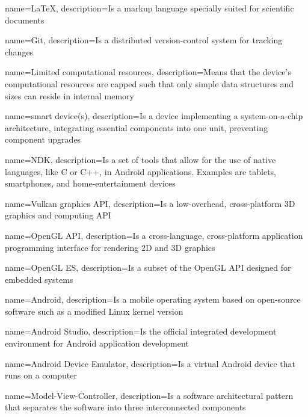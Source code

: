 {
    name={LaTeX},
    description={Is a markup language specially suited 
    for scientific documents \cite{latexref}}
}

{
    name={Git},
    description={Is a distributed version-control system for tracking changes \cite{gitref}}
}

{
    name={Limited computational resources},
    description={Means that the device's computational resources are capped such that only simple data structures and sizes can reside in internal memory}
}

{
    name={smart device(s)},
    description={Is a device implementing a system-on-a-chip architecture, integrating essential components into one unit, preventing component upgrades}
}

{
    name={NDK},
    description={Is a set of tools that allow for the use of native languages, like C or C++, in \gls{Android} applications. Examples are tablets, smartphones, and home-entertainment devices}
}

{
    name={Vulkan graphics API},
    description={Is a low-overhead, cross-platform 3D graphics and computing API}    
}

{
    name={OpenGL API},
    description={Is a cross-language, cross-platform application programming interface for rendering 2D and 3D graphics}
}

{
    name={OpenGL ES},
    description={Is a subset of the \gls{OpenGL API} designed for embedded systems}
}

{
    name={Android},
    description={Is a mobile operating system based on open-source software such as a modified Linux kernel version}
}

{
    name={Android Studio},
    description={Is the official integrated development environment for \gls{Android} application development}
}

{
    name={Android Device Emulator},
    description={Is a virtual \gls{Android} device that runs on a computer}
}

{
    name={Model-View-Controller},
    description={Is a software architectural pattern that separates the software into three interconnected components}     
}

